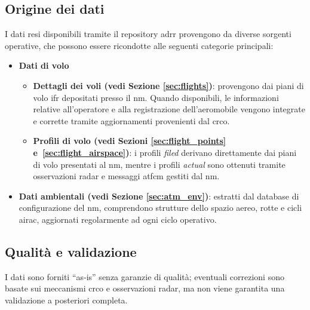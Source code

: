\subsection{Origine dei dati}
I dati resi disponibili tramite il repository \gls{adrr} provengono da diverse sorgenti operative, che possono essere ricondotte alle seguenti categorie principali:
\DisablePunct
\begin{itemize}
\item \textbf{Dati di volo}
\begin{itemize}
\item \textbf{Dettagli dei voli (vedi Sezione \ref{sec:flights})}: provengono dai piani di volo \gls{ifr} depositati presso il \gls{nm}. Quando disponibili, le informazioni relative all'operatore e alla registrazione dell'aeromobile vengono integrate e corrette tramite aggiornamenti provenienti dal \gls{crco}.
\item \textbf{Profili di volo (vedi Sezioni \ref{sec:flight_points} e~\ref{sec:flight_airspace})}: i profili \textit{filed} derivano direttamente dai piani di volo presentati al \gls{nm}, mentre i profili \textit{actual} sono ottenuti tramite osservazioni radar e messaggi \gls{atfcm} gestiti dal \gls{nm}.
\end{itemize}

\item \textbf{Dati ambientali (vedi Sezione \ref{sec:atm_env})}: estratti dal database di configurazione del \gls{nm}, comprendono strutture dello spazio aereo, rotte e cicli \gls{airac}, aggiornati regolarmente ad ogni ciclo operativo.
\end{itemize}
\EnablePunct\subsection{Qualità e validazione}
I dati sono forniti ``as‐is'' senza garanzie di qualità; eventuali correzioni sono basate sui meccanismi \gls{crco} e osservazioni radar, ma non viene garantita una validazione a posteriori completa.  

